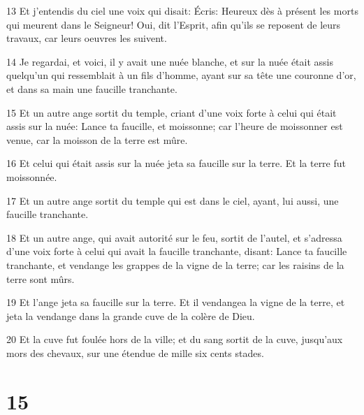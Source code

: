 \par 13 Et j'entendis du ciel une voix qui disait: Écris: Heureux dès à présent les morts qui meurent dans le Seigneur! Oui, dit l'Esprit, afin qu'ils se reposent de leurs travaux, car leurs oeuvres les suivent.
\par 14 Je regardai, et voici, il y avait une nuée blanche, et sur la nuée était assis quelqu'un qui ressemblait à un fils d'homme, ayant sur sa tête une couronne d'or, et dans sa main une faucille tranchante.
\par 15 Et un autre ange sortit du temple, criant d'une voix forte à celui qui était assis sur la nuée: Lance ta faucille, et moissonne; car l'heure de moissonner est venue, car la moisson de la terre est mûre.
\par 16 Et celui qui était assis sur la nuée jeta sa faucille sur la terre. Et la terre fut moissonnée.
\par 17 Et un autre ange sortit du temple qui est dans le ciel, ayant, lui aussi, une faucille tranchante.
\par 18 Et un autre ange, qui avait autorité sur le feu, sortit de l'autel, et s'adressa d'une voix forte à celui qui avait la faucille tranchante, disant: Lance ta faucille tranchante, et vendange les grappes de la vigne de la terre; car les raisins de la terre sont mûrs.
\par 19 Et l'ange jeta sa faucille sur la terre. Et il vendangea la vigne de la terre, et jeta la vendange dans la grande cuve de la colère de Dieu.
\par 20 Et la cuve fut foulée hors de la ville; et du sang sortit de la cuve, jusqu'aux mors des chevaux, sur une étendue de mille six cents stades.

\chapter{15}

